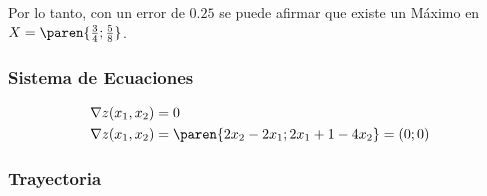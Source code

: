 \begin{homeworkProblem}
Por lo tanto, con un error de $0.25$ se puede afirmar que existe un Máximo en $X=\paren{\frac{3}{4};\frac{5}{8}}$.

\subsubsection{Sistema de Ecuaciones}
\begin{align*}
    &\nabla z(x_1,x_2)=0\\
    &\nabla z(x_1,x_2)=\paren{2x_2-2x_1;2x_1+1-4x_2}=(0;0)\\
\end{align*}


\subsubsection{Trayectoria}


\end{homeworkProblem}